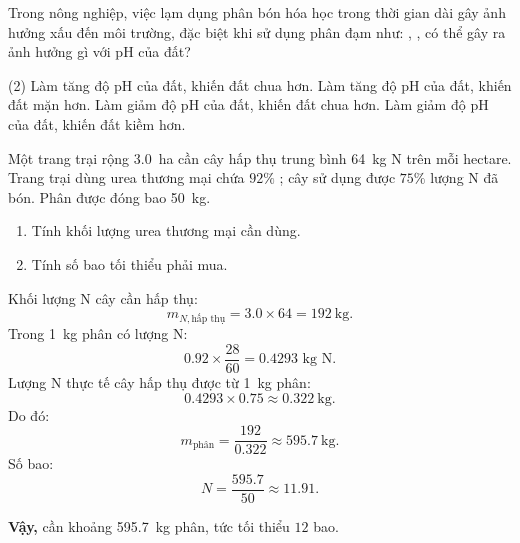 \begin{tuluyen}
Trong nông nghiệp, việc lạm dụng phân bón hóa học trong thời gian dài gây ảnh hưởng xấu đến môi trường, đặc biệt khi sử dụng phân đạm như: , ,  có thể gây ra ảnh hưởng gì với pH của đất?
\begin{tasks}(2)
\task Làm tăng độ pH của đất, khiến đất chua hơn.
\task Làm tăng độ pH của đất, khiến đất mặn hơn.
\task Làm giảm độ pH của đất, khiến đất chua hơn.
\task Làm giảm độ pH của đất, khiến đất kiềm hơn.
\end{tasks}
\end{tuluyen}

\begin{tuluyen}
Một trang trại rộng \SI{3.0}{\hectare} cần cây hấp thụ trung bình \SI{64}{\kilo\gram} N trên mỗi hectare. Trang trại dùng urea thương mại chứa $92\%$ ; cây sử dụng được $75\%$ lượng N đã bón. Phân được đóng bao \SI{50}{\kilo\gram}.
\begin{enumerate}
\item Tính khối lượng urea thương mại cần dùng.
\item Tính số bao tối thiểu phải mua.
\end{enumerate}
\begin{loigiaiBT}
Khối lượng N cây cần hấp thụ:
\[
m_{N,\text{hấp thụ}}=3.0\times64=\SI{192}{\kilo\gram}.
\]
Trong \SI{1}{\kilo\gram} phân có lượng N:
\[
0.92\times\frac{28}{60}=0.4293\text{ kg N}.
\]
Lượng N thực tế cây hấp thụ được từ \SI{1}{\kilo\gram} phân:
\[
0.4293\times0.75\approx\SI{0.322}{\kilo\gram}.
\]
Do đó:
\[
m_{\text{phân}}=\frac{192}{0.322}\approx\SI{595.7}{\kilo\gram}.
\]
Số bao:
\[
N=\frac{595.7}{50}\approx11.91.
\]

\textbf{Vậy,} cần khoảng \SI{595.7}{\kilo\gram} phân, tức tối thiểu $12$ bao.
\end{loigiaiBT}
\end{tuluyen}

